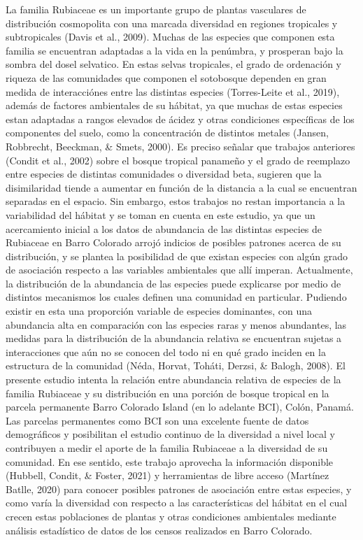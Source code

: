 \documentclass[11pt,]{article}
\begin{document}
La familia Rubiaceae es un importante grupo de plantas vasculares de
distribución cosmopolita con una marcada diversidad en regiones
tropicales y subtropicales (Davis et al., 2009). Muchas de las especies
que componen esta familia se encuentran adaptadas a la vida en la
penúmbra, y prosperan bajo la sombra del dosel selvatico. En estas
selvas tropicales, el grado de ordenación y riqueza de las comunidades
que componen el sotobosque dependen en gran medida de interacciónes
entre las distintas especies (Torres-Leite et al., 2019), además de
factores ambientales de su hábitat, ya que muchas de estas especies
estan adaptadas a rangos elevados de ácidez y otras condiciones
específicas de los componentes del suelo, como la concentración de
distintos metales (Jansen, Robbrecht, Beeckman, \& Smets, 2000). Es
preciso señalar que trabajos anteriores (Condit et al., 2002) sobre el
bosque tropical panameño y el grado de reemplazo entre especies de
distintas comunidades o diversidad beta, sugieren que la disimilaridad
tiende a aumentar en función de la distancia a la cual se encuentran
separadas en el espacio. Sin embargo, estos trabajos no restan
importancia a la variabilidad del hábitat y se toman en cuenta en este
estudio, ya que un acercamiento inicial a los datos de abundancia de las
distintas especies de Rubiaceae en Barro Colorado arrojó indicios de
posibles patrones acerca de su distribución, y se plantea la posibilidad
de que existan especies con algún grado de asociación respecto a las
variables ambientales que allí imperan. Actualmente, la distribución de
la abundancia de las especies puede explicarse por medio de distintos
mecanismos los cuales definen una comunidad en particular. Pudiendo
existir en esta una proporción variable de especies dominantes, con una
abundancia alta en comparación con las especies raras y menos
abundantes, las medidas para la distribución de la abundancia relativa
se encuentran sujetas a interacciones que aún no se conocen del todo ni
en qué grado inciden en la estructura de la comunidad (Néda, Horvat,
Toháti, Derzsi, \& Balogh, 2008). El presente estudio intenta la
relación entre abundancia relativa de especies de la familia Rubiaceae y
su distribución en una porción de bosque tropical en la parcela
permanente Barro Colorado Island (en lo adelante BCI), Colón, Panamá.
Las parcelas permanentes como BCI son una excelente fuente de datos
demográficos y posibilitan el estudio continuo de la diversidad a nivel
local y contribuyen a medir el aporte de la familia Rubiaceae a la
diversidad de su comunidad. En ese sentido, este trabajo aprovecha la
información disponible (Hubbell, Condit, \& Foster, 2021) y herramientas
de libre acceso (Martínez Batlle, 2020) para conocer posibles patrones
de asociación entre estas especies, y como varía la diversidad con
respecto a las características del hábitat en el cual crecen estas
poblaciones de plantas y otras condiciones ambientales mediante análisis
estadístico de datos de los censos realizados en Barro Colorado.
\end{document}
